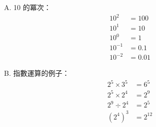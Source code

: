 \documentclass[12pt]{article}
\begin{document}
\begin{problem}
  \item[A.] 10 的冪次：
  \begin{align*}
    10^2 &= 100 \\
    10^1 &= 10 \\
    10^0 &= 1 \\
    10^{-1} &= 0.1 \\
    10^{-2} &= 0.01
  \end{align*}
  \item[B.] 指數運算的例子：
  \begin{align*}
    2^5 \times 3^5 &= 6^5 \\
    2^5 \times 2^4 &= 2^9 \\
    2^9 \div 2^4 &= 2^5 \\
    (2^4)^3 &= 2^{12}
  \end{align*}
\end{problem}
\end{document}
